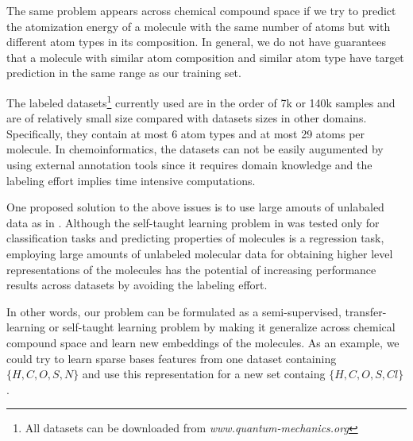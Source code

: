 \documentclass[10pt,journal,a4paper]{IEEEtran}
\begin{document}
The same problem appears across chemical compound space if we try to predict the atomization energy of a molecule with the same number of atoms but with different atom types in its composition. In general, we do not have guarantees that a molecule with similar atom composition and similar atom type have target prediction in the same range as our training set.

The labeled datasets\footnote{All datasets can be downloaded from \textit{www.quantum-mechanics.org}} currently used  are in the order of 7k or 140k samples and are of relatively small size compared with datasets sizes in other domains. Specifically, they contain at most 6 atom types and at most 29 atoms per molecule. In chemoinformatics, the datasets can not be easily augumented by using external annotation tools since it requires domain knowledge and the labeling effort implies time intensive computations.

One proposed solution to the above issues is to use large amouts of unlabaled data as in \cite{selftaughtl}.
Although the self-taught learning problem in \cite{selftaughtl} was tested only for classification tasks and predicting properties of molecules is a regression task, employing large amounts of unlabeled molecular data for obtaining higher level representations of the molecules has the potential of increasing performance results across datasets by avoiding the labeling effort.


%

In other words, our problem can be formulated as a semi-supervised, transfer-learning or self-taught learning problem by making it generalize across chemical compound space and learn new embeddings of the molecules. As an example, we could try to learn sparse bases features from one dataset containing $\{H, C, O, S, N\}$ and use this representation for a new set containg $\{H, C, O, S, Cl\}$.
\end{document}
